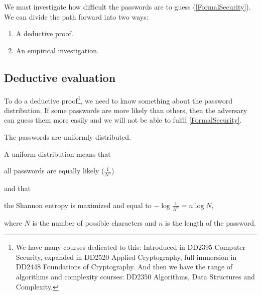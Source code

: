 \begin{frame}
  \begin{solution}
    We must investigate how difficult the passwords are to guess 
    (\cref{FormalSecurity}).
    We can divide the path forward into two ways:
    \begin{enumerate}
      \item A deductive proof.
      \item An empirical investigation.
    \end{enumerate}
  \end{solution}

\end{frame}

\subsection{Deductive evaluation}

To do a deductive proof\footnote{%
  We have many courses dedicated to this:
  Introduced in DD2395 Computer Security,
  expanded in DD2520 Applied Cryptography,
  full immersion in DD2448 Foundations of Cryptography.
  And then we have the range of algorithms and complexity courses:
  \eg DD2350 Algorithms, Data Structures and Complexity.
}, we need to know something about the password distribution.
If some passwords are more likely than others, then the adversary can guess 
them more easily and we will not be able to fulfil \cref{FormalSecurity}.

\begin{frame}
  \begin{assumption}\label{AssumeUniform}
    The passwords are uniformly distributed.
  \end{assumption}
\end{frame}

A uniform distribution means that
\begin{frame}
  all passwords are equally likely (\(\frac{1}{N^n}\))
\end{frame}
and that
\begin{frame}
  the Shannon entropy is maximized and equal to \(-\log \frac{1}{N^n} = n \log 
  {N}\),
\end{frame}
where \(N\) is the number of possible characters and \(n\) is the length of the 
password.

